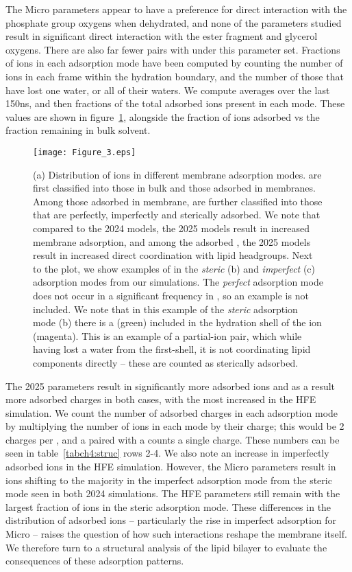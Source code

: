 The  Micro parameters appear to have a preference for direct interaction with the phosphate group oxygens when dehydrated, and none of the \mg{} parameters studied result in significant direct interaction with the ester fragment and glycerol oxygens. There are also far fewer pairs with \cl{} under this parameter set.
Fractions of ions in each adsorption mode have been computed by counting the number of ions in each frame within the hydration boundary, 
and the number of those that have lost one water, or all of their waters. We compute averages over the last 150ns, and then 
fractions of the total adsorbed ions present in each mode. These values are shown in figure~\ref{figch4:adfrac}, alongside the fraction of ions adsorbed vs the fraction remaining in bulk solvent. 
\begin{figure}[H]
    \caption[Fraction of ions in each adsorption modality]{ (a) Distribution of \mg{} ions in different membrane adsorption modes. \mg{} are first classified into those in bulk and those adsorbed in membranes. 
        Among those adsorbed in membrane, \mg{} are 
        further classified into those that are perfectly, imperfectly and sterically adsorbed. 
        We note that compared to the 2024 models, the 2025 models result in increased membrane adsorption, 
        and among the adsorbed \mg{}, the 2025 models result in increased direct coordination with lipid headgroups. Next to the plot, we show examples of \mg{} in the \emph{steric} (b) and \emph{imperfect} (c) 
        adsorption modes from our simulations. The \emph{perfect} adsorption mode does not occur in a significant frequency in \mg{}, so an example is not included. We note that
    in this example of the \emph{steric} adsorption mode (b) there is a \cl{} (green) included in the hydration shell of the \mg{} ion (magenta). This is an example of a partial-ion
pair, which while having lost a water from the first-shell, it is not coordinating lipid components directly -- these are counted as sterically adsorbed.}
    \label{figch4:adfrac}
    \texttt{[image: Figure\_3.eps]}
\end{figure}
The 2025 parameters result in significantly more adsorbed ions and as a result more adsorbed charges in both cases, with the most increased in the  HFE simulation.
We count the number of adsorbed charges in each adsorption mode by multiplying the number of ions in each mode by their charge; this would be 2 charges per \mg{}, and a \mg{} paired with a \cl{}
counts a single charge. 
These numbers can be seen in table~\ref{tabch4:struc} rows 2-4.
We also note an increase in imperfectly adsorbed ions in the  HFE simulation. However, the  Micro parameters result in ions shifting to the majority in the imperfect
adsorption mode from the steric mode seen in both 2024 simulations.
The  HFE parameters still remain with the largest fraction of ions in the steric adsorption mode. 
These differences in the distribution of adsorbed \mg{} ions -- particularly the rise in imperfect adsorption for  Micro -- 
raises the question of how such interactions reshape the membrane itself. We therefore turn to a structural analysis of the lipid bilayer 
to evaluate the consequences of these adsorption patterns.


